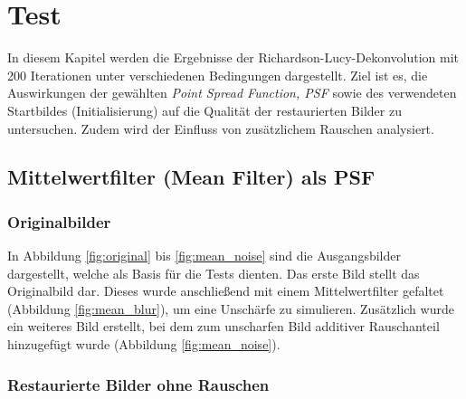 \section{Test}

In diesem Kapitel werden die Ergebnisse der Richardson-Lucy-Dekonvolution mit 200 Iterationen unter verschiedenen Bedingungen dargestellt. Ziel ist es, die Auswirkungen der gewählten \textit{Point Spread Function, PSF} sowie des verwendeten Startbildes (Initialisierung) auf die Qualität der restaurierten Bilder zu untersuchen. Zudem wird der Einfluss von zusätzlichem Rauschen analysiert.



\subsection{Mittelwertfilter (Mean Filter) als PSF}

\subsubsection{Originalbilder}

In Abbildung \ref{fig:original} bis \ref{fig:mean_noise} sind die Ausgangsbilder dargestellt, welche als Basis für die Tests dienten. Das erste Bild stellt das Originalbild dar. Dieses wurde anschließend mit einem Mittelwertfilter gefaltet (Abbildung \ref{fig:mean_blur}), um eine Unschärfe zu simulieren. Zusätzlich wurde ein weiteres Bild erstellt, bei dem zum unscharfen Bild additiver Rauschanteil hinzugefügt wurde (Abbildung \ref{fig:mean_noise}).

\noindent
\begin{minipage}[t]{0.33\textwidth}
\end{minipage}
%
\begin{minipage}[t]{0.33\textwidth}
\end{minipage}
%
\begin{minipage}[t]{0.33\textwidth}
\end{minipage}

\subsubsection{Restaurierte Bilder ohne Rauschen}

